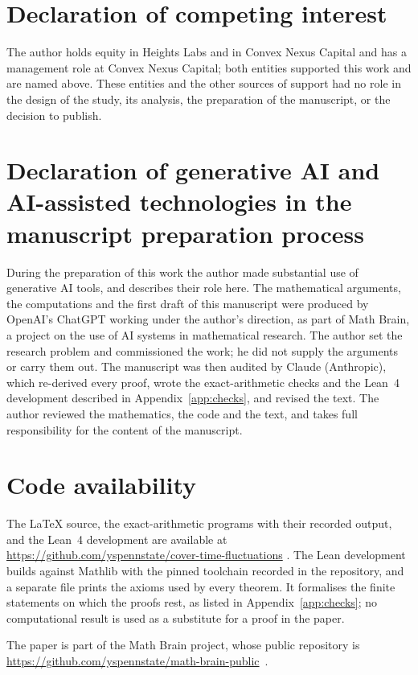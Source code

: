 \documentclass[11pt]{amsart}
\theoremstyle{remark}
\numberwithin{equation}{section}
\begin{document}
\section*{Declaration of competing interest}
The author holds equity in Heights Labs and in Convex Nexus Capital and has a management role at Convex Nexus Capital; both entities supported this work and are named above. These entities and the other sources of support had no role in the design of the study, its analysis, the preparation of the manuscript, or the decision to publish.

\section*{Declaration of generative AI and AI-assisted technologies in the manuscript preparation process}
During the preparation of this work the author made substantial use of generative AI tools, and describes their role here. The mathematical arguments, the computations and the first draft of this manuscript were produced by OpenAI's ChatGPT working under the author's direction, as part of Math Brain, a project on the use of AI systems in mathematical research. The author set the research problem and commissioned the work; he did not supply the arguments or carry them out. The manuscript was then audited by Claude (Anthropic), which re-derived every proof, wrote the exact-arithmetic checks and the Lean~4 development described in Appendix~\ref{app:checks}, and revised the text. The author reviewed the mathematics, the code and the text, and takes full responsibility for the content of the manuscript.

\section*{Code availability}
The \LaTeX{} source, the exact-arithmetic programs with their recorded output, and the Lean~4 development are available at \url{https://github.com/yspennstate/cover-time-fluctuations} \cite{Repo}. The Lean development builds against Mathlib with the pinned toolchain recorded in the repository, and a separate file prints the axioms used by every theorem. It formalises the finite statements on which the proofs rest, as listed in Appendix~\ref{app:checks}; no computational result is used as a substitute for a proof in the paper.

The paper is part of the Math Brain project, whose public repository is \url{https://github.com/yspennstate/math-brain-public}~\cite{MathBrainRepo}.
\end{document}
